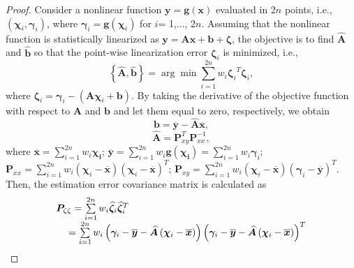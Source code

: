 \documentclass[10pt]{IEEEtran}
\begin{document}
\begin{proof}
Consider a nonlinear function $\bm{y}=\bm{g}(\bm{x})$ evaluated in 2$n$ points, i.e., $\left( {{\bm{\chi}_i},{\bm{\gamma}_i}} \right)$, where ${\bm{\gamma}_i} = \bm{g}\left( {{\bm{\chi}_i}} \right)$ for $i$= 1,..., 2$n$. Assuming that the nonlinear function is statistically linearized as $\bm{y}=\bm{Ax}+\bm{b}+\bm{\zeta}$, the objective is to find $\bm{\widehat A}$ and $\bm{\widehat b}$ so that the point-wise linearization error $\bm{\zeta}_i$ is minimized, i.e.,
\begin{equation}
\left\{ {\bm{\widehat A, \widehat b}} \right\} = \arg \min \sum\limits_{i = 1}^{2n} {{w_i}{\bm{\zeta}_i}^T{\bm{\zeta}_i}},
\label{Eq:statistical_linearization_objective_function}
\end{equation}
where $\bm{\zeta}_i=\bm{\gamma}_i-(\bm{A}\bm{\chi}_i+\bm{b})$. By taking the derivative of the objective function with respect to $\bm{A}$ and $\bm{b}$ and let them equal to zero, respectively, we obtain
\begin{equation}
\bm{b} = \bm{\overline y}  - \bm{\widehat A}\bm{\overline x},
\label{Eq:statistical_linearization_b}
\end{equation}
\begin{equation}
\bm{\widehat A}=\bm{P}_{xy}^T\bm{P}_{xx}^{-1},
\label{Eq:statistical_linearization_A}
\end{equation}
where $\bm{\overline x}  = \sum\limits_{i = 1}^{2n} {{w_i}{\bm{\chi _i}}}$; $\bm{\overline y} = \sum\limits_{i = 1}^{2n} {{w_i}\bm{g}\left( {{\bm{\chi _i}}} \right)}  = \sum\limits_{i = 1}^{2n} {{w_i}{\bm{\gamma}_i}}$; ${\bm{P}_{xx}} = \sum\limits_{i = 1}^{2n} {{w_i}\left( {{\bm{\chi}_i} - \bm{\overline x} } \right)} {\left( {{\bm{\chi}_i} - \bm{\overline x} } \right)^T}$; ${\bm{P}_{xy}} = \sum\limits_{i = 1}^{2n} {{w_i}\left( {{\bm{\chi}_i} - \bm{\overline x} } \right)} {\left( {{\bm{\gamma}_i} - \bm{\overline y} } \right)^T}$. Then, the estimation error covariance matrix is calculated as
\begin{equation}
\begin{array}{l}
{\bm{P}_{\zeta \zeta }} = \sum\limits_{i = 1}^{2n} {{w_i}{\bm{\widehat \zeta}_i}{\bm{\widehat\zeta}_i}^T} \\
{\rm{\quad   }} = \sum\limits_{i = 1}^{2n} {{w_i}\left( {{\bm{\gamma}_i} - \bm{\overline y}  - \bm{\widehat A}\left( {{\bm{\chi}_i} - \bm{\overline x} } \right)} \right){{\left( {{\bm{\gamma}_i} - \bm{\overline y}  - \bm{\widehat A}\left( {{\bm{\chi}_i} - \bm{\overline x} } \right)} \right)}^T}} \\

\end{array}
\end{equation}
\end{proof}
\end{document}
